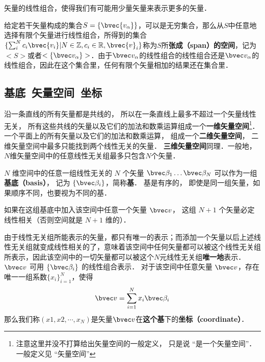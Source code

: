 





矢量的线性组合，使得我们有可能用少量矢量来表示更多的矢量．

给定若干矢量构成的集合$S=\{\bvec{v_\alpha}\}$，可以是无穷集合，那么从$S$中任意地选择有限个矢量进行线性组合，所得到的集合$\{\sum_i^N c_i\bvec{v_i}|N\in\mathbb{Z}, c_i\in\mathbb{R}, \bvec{v}_i\}$称为$S$所\textbf{张成（span）的空间}，记为$<S>$或者$<\{\bvec v_\alpha\}>$．由于$\bvec v_\alpha$的线性组合的线性组合还是$\bvec v_\alpha$的线性组合，因此在这个集合里，任何有限个矢量相加的结果还在集合里．



\subsection{基底\ 矢量空间\ 坐标}
沿一条直线的所有矢量都是共线的， 所以在一条直线上最多不超过一个矢量线性无关， 所有这些共线的矢量以及它们的加法和数乘运算组成一个\textbf{一维矢量空间}\footnote{注意这里并没不打算给出矢量空间的一般定义， 只是说 “是一个矢量空间”． 一般定义见 “矢量空间”}． 一个平面上的所有矢量以及它们的加法和数乘运算， 组成一个\textbf{二维矢量空间}， 二维矢量空间中最多只能找到两个线性无关的矢量． \textbf{三维矢量空间}同理．一般地，$N$维矢量空间中的任意线性无关组最多只包含$N$个矢量．

$N$ 维空间中的任意一组线性无关的 $N$ 个矢量 $\bvec \beta_1\dots \bvec \beta_N$ 可以作为一组\textbf{基底（basis）}， 记为 $\{\bvec \beta_i\}$，简称\textbf{基}． 基是有序的， 即使是同一组矢量，如果顺序不同，也要视为不同的基． 

如果在这组基底中加入该空间中任意一个矢量 $\bvec v$， 这组 $N+1$ 个矢量必定线性相关（否则空间就是 $N+1$ 维的）．

由于线性无关组所能表示的矢量，都只有唯一的表示；而添加一个矢量以后上述线性无关组就变成线性相关的了，意味着该空间中任何矢量都可以被这个线性无关组所表示，因此该空间中的一切矢量都可以被这个$N$元线性无关组\textbf{唯一地}表示．$\bvec v$ 可用 $\{\bvec \beta_i\}$ 的线性组合表示． 对于该空间中任意矢量 $\bvec v$，存在唯一一组系数$\{x_i\}_{i=1}^N$，使得
\begin{equation}\label{LSpace_eq5}
\bvec v = \sum_{i=1}^N x_i \bvec \beta_i
\end{equation}
那么我们称$(x1, x2, \cdots, x_N)$是矢量$\bvec v$在\textbf{这个基}下的\textbf{坐标（coordinate）}．


